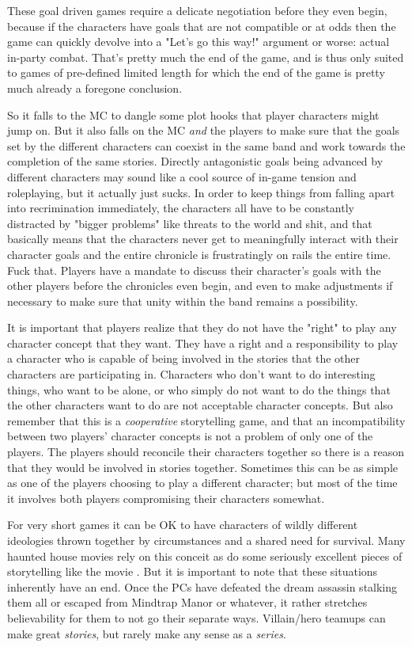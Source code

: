These goal driven games require a delicate negotiation before they even begin, because if the characters have goals that are not compatible or at odds then the game can quickly devolve into a "Let's go this way!" argument or worse: actual in-party combat. That's pretty much the end of the game, and is thus only suited to games of pre-defined limited length for which the end of the game is pretty much already a foregone conclusion.

So it falls to the MC to dangle some plot hooks that player characters might jump on. But it also falls on the MC \textit{and} the players to make sure that the goals set by the different characters can coexist in the same band and work towards the completion of the same stories. Directly antagonistic goals being advanced by different characters may sound like a cool source of in-game tension and roleplaying, but it actually just sucks. In order to keep things from falling apart into recrimination immediately, the characters all have to be constantly distracted by "bigger problems" like threats to the world and shit, and that basically means that the characters never get to meaningfully interact with their character goals and the entire chronicle is frustratingly on rails the entire time. Fuck that. Players have a mandate to discuss their character's goals with the other players before the chronicles even begin, and even to make adjustments if necessary to make sure that unity within the band remains a possibility.

It is important that players realize that they do not have the "right" to play any character concept that they want. They have a right and a responsibility to play a character who is capable of being involved in the stories that the other characters are participating in. Characters who don't want to do interesting things, who want to be alone, or who simply do not want to do the things that the other characters want to do are not acceptable character concepts. But also remember that this is a \textit{cooperative} storytelling game, and that an incompatibility between two players' character concepts is not a problem of only one of the players. The players should reconcile their characters together so there is a reason that they would be involved in stories together. Sometimes this can be as simple as one of the players choosing to play a different character; but most of the time it involves both players compromising their characters somewhat.

For very short games it can be OK to have characters of wildly different ideologies thrown together by circumstances and a shared need for survival. Many haunted house movies rely on this conceit as do some seriously excellent pieces of storytelling like the movie . But it is important to note that these situations inherently have an end. Once the PCs have defeated the dream assassin stalking them all or escaped from Mindtrap Manor or whatever, it rather stretches believability for them to not go their separate ways. Villain/hero teamups can make great \textit{stories}, but rarely make any sense as a \textit{series}.


